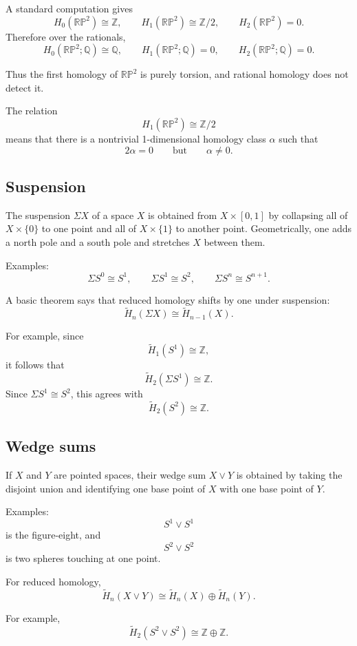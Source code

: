 \documentclass[12pt,a4paper]{article}
\theoremstyle{notespace}
\begin{document}
A standard computation gives
\[
H_0(\mathbb{RP}^2)\cong \mathbb{Z},
\qquad
H_1(\mathbb{RP}^2)\cong \mathbb{Z}/2,
\qquad
H_2(\mathbb{RP}^2)=0.
\]
Therefore over the rationals,
\[
H_0(\mathbb{RP}^2;\mathbb{Q})\cong \mathbb{Q},
\qquad
H_1(\mathbb{RP}^2;\mathbb{Q})=0,
\qquad
H_2(\mathbb{RP}^2;\mathbb{Q})=0.
\]

Thus the first homology of \(\mathbb{RP}^2\) is purely torsion, and rational homology does not detect it.

The relation
\[
H_1(\mathbb{RP}^2)\cong \mathbb{Z}/2
\]
means that there is a nontrivial 1-dimensional homology class \(\alpha\) such that
\[
2\alpha=0
\qquad \text{but} \qquad \alpha\neq 0.
\]

\subsection{Suspension}

The suspension \(\Sigma X\) of a space \(X\) is obtained from \(X\times [0,1]\) by collapsing all of \(X\times \{0\}\) to one point and all of \(X\times \{1\}\) to another point. Geometrically, one adds a north pole and a south pole and stretches \(X\) between them.

Examples:
\[
\Sigma S^0\cong S^1,
\qquad
\Sigma S^1\cong S^2,
\qquad
\Sigma S^n\cong S^{n+1}.
\]

A basic theorem says that reduced homology shifts by one under suspension:
\[
\widetilde{H}_n(\Sigma X)\cong \widetilde{H}_{n-1}(X).
\]

For example, since
\[
\widetilde{H}_1(S^1)\cong \mathbb{Z},
\]
it follows that
\[
\widetilde{H}_2(\Sigma S^1)\cong \mathbb{Z}.
\]
Since \(\Sigma S^1\cong S^2\), this agrees with
\[
\widetilde{H}_2(S^2)\cong \mathbb{Z}.
\]

\subsection{Wedge sums}

If \(X\) and \(Y\) are pointed spaces, their wedge sum \(X\vee Y\) is obtained by taking the disjoint union and identifying one base point of \(X\) with one base point of \(Y\).

Examples:
\[
S^1\vee S^1
\]
is the figure-eight, and
\[
S^2\vee S^2
\]
is two spheres touching at one point.

For reduced homology,
\[
\widetilde{H}_n(X\vee Y)\cong \widetilde{H}_n(X)\oplus \widetilde{H}_n(Y).
\]

For example,
\[
\widetilde{H}_2(S^2\vee S^2)\cong \mathbb{Z}\oplus \mathbb{Z}.
\]
\end{document}
